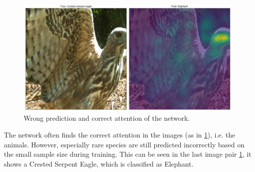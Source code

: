 \documentclass[journal, a4paper]{IEEEtran}
\begin{document}
\begin{figure}[!hbt]
\begin{center}
		\includegraphics[width=\columnwidth]{images/Attention_wrong_easy_weird.png}
		\caption{Wrong prediction and correct attention of the network.}
		\label{fig:wrong_correct}
		\end{center}
	\end{figure}
	
The network often finds the correct attention in the images (as in \ref{fig:wrong_correct}), i.e. the animals.
However, especially rare species are still predicted incorrectly based on the small sample size during training.
This can be seen in the last image pair \ref{fig:wrong_correct}, it shows a Crested Serpent Eagle, which is classified as Elephant. 
\end{document}
